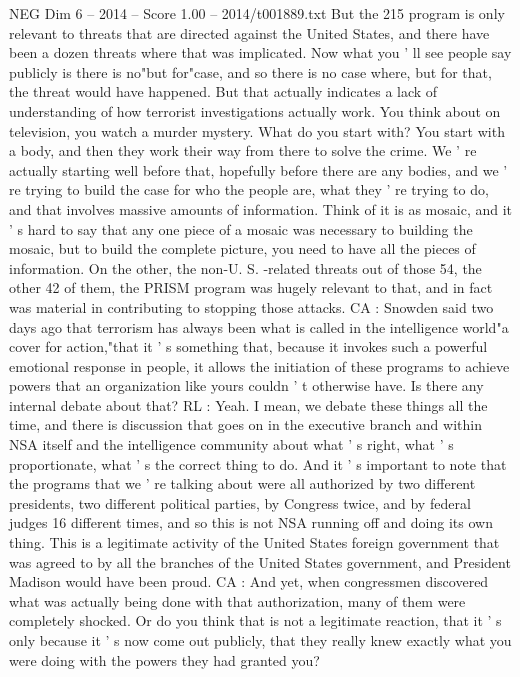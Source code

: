 \begin{textsample}{NEG Dim 6 – 2014 – Score 1.00 – 2014/t001889.txt}
But the 215 program is only relevant to threats that are directed against the United States, and there have been a dozen threats where that was implicated.
Now what you ' ll see people say publicly is there is no"but for"case, and so there is no case where, but for that, the threat would have happened.
But that actually indicates a lack of understanding of how terrorist investigations actually work.
You think about on television, you watch a murder mystery.
What do you start with?
You start with a body, and then they work their way from there to solve the crime.
We ' re actually starting well before that, hopefully before there are any bodies, and we ' re trying to build the case for who the people are, what they ' re trying to do, and that involves massive amounts of information.
Think of it is as mosaic, and it ' s hard to say that any one piece of a mosaic was necessary to building the mosaic, but to build the complete picture, you need to have all the pieces of information.
On the other, the non-U.
S. -related threats out of those 54, the other 42 of them, the PRISM program was hugely relevant to that, and in fact was material in contributing to stopping those attacks.
CA : Snowden said two days ago that terrorism has always been what is called in the intelligence world"a cover for action,"that it ' s something that, because it invokes such a powerful emotional response in people, it allows the initiation of these programs to achieve powers that an organization like yours couldn ' t otherwise have.
Is there any internal debate about that?
RL : Yeah.
I mean, we debate these things all the time, and there is discussion that goes on in the executive branch and within NSA itself and the intelligence community about what ' s right, what ' s proportionate, what ' s the correct thing to do.
And it ' s important to note that the programs that we ' re talking about were all authorized by two different presidents, two different political parties, by Congress twice, and by federal judges 16 different times, and so this is not NSA running off and doing its own thing.
This is a legitimate activity of the United States foreign government that was agreed to by all the branches of the United States government, and President Madison would have been proud.
CA : And yet, when congressmen discovered what was actually being done with that authorization, many of them were completely shocked.
Or do you think that is not a legitimate reaction, that it ' s only because it ' s now come out publicly, that they really knew exactly what you were doing with the powers they had granted you?

\end{textsample}
